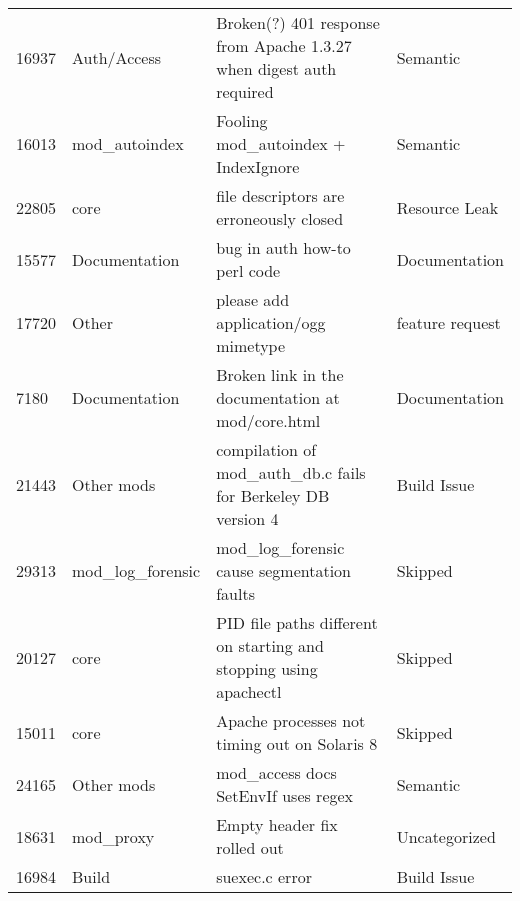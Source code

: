 \begin{longtable}[c]{llll}
16937  & Auth/Access        & Broken(?) 401 response from Apache 1.3.27 when digest auth required                                            & Semantic          \\
16013  & mod\_autoindex     & Fooling mod\_autoindex + IndexIgnore                                                                           & Semantic          \\
22805  & core               & file descriptors are erroneously closed                                                                        & Resource Leak     \\
15577  & Documentation      & bug in auth how-to perl code                                                                                   & Documentation     \\
17720  & Other              & please add application/ogg mimetype                                                                            & feature request   \\
7180   & Documentation      & Broken link in the documentation at mod/core.html                                                              & Documentation     \\
21443  & Other mods         & compilation of mod\_auth\_db.c fails for Berkeley DB version 4                                                 & Build Issue       \\
29313  & mod\_log\_forensic & mod\_log\_forensic cause segmentation faults                                                                   & Skipped           \\
20127  & core               & PID file paths different on starting and stopping using apachectl                                              & Skipped           \\
15011  & core               & Apache processes not timing out on Solaris 8                                                                   & Skipped           \\
24165  & Other mods         & mod\_access docs SetEnvIf uses regex                                                                           & Semantic          \\
18631  & mod\_proxy         & Empty header fix rolled out                                                                                    & Uncategorized     \\
16984  & Build              & suexec.c error                                                                                                 & Build Issue       \\

\end{longtable}
